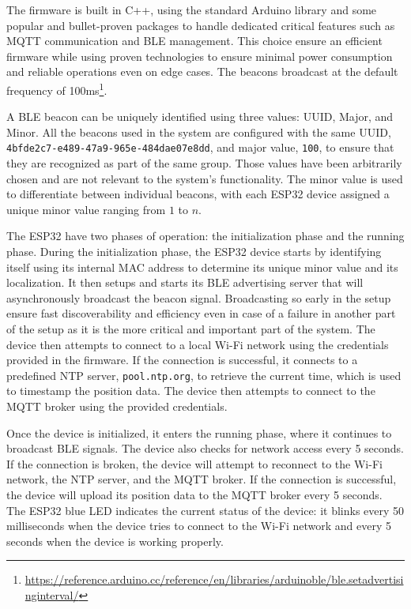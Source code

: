 The firmware is built in C++, using the standard Arduino library and some popular and bullet-proven packages to handle dedicated critical features such as MQTT communication and BLE management. This choice ensure an efficient firmware while using proven technologies to ensure minimal power consumption and reliable operations even on edge cases. The beacons broadcast at the default frequency of 100ms\footnote{\url{https://reference.arduino.cc/reference/en/libraries/arduinoble/ble.setadvertisinginterval/}}.

A BLE beacon can be uniquely identified using three values: UUID, Major, and Minor. All the beacons used in the system are configured with the same UUID, \texttt{4bfde2c7-e489-47a9-965e-484dae07e8dd}, and major value, \texttt{100}, to ensure that they are recognized as part of the same group. Those values have been arbitrarily chosen and are not relevant to the system's functionality. The minor value is used to differentiate between individual beacons, with each ESP32 device assigned a unique minor value ranging from $1$ to $n$.

The ESP32 have two phases of operation: the initialization phase and the running phase. During the initialization phase, the ESP32 device starts by identifying itself using its internal MAC address to determine its unique minor value and its localization. It then setups and starts its BLE advertising server that will asynchronously broadcast the beacon signal. Broadcasting so early in the setup ensure fast discoverability and efficiency even in case of a failure in another part of the setup as it is the more critical and important part of the system. The device then attempts to connect to a local Wi-Fi network using the credentials provided in the firmware. If the connection is successful, it connects to a predefined NTP server, \texttt{pool.ntp.org}, to retrieve the current time, which is used to timestamp the position data. The device then attempts to connect to the MQTT broker using the provided credentials. 

Once the device is initialized, it enters the running phase, where it continues to broadcast BLE signals. The device also checks for network access every 5 seconds. If the connection is broken, the device will attempt to reconnect to the Wi-Fi network, the NTP server, and the MQTT broker. If the connection is successful, the device will upload its position data to the MQTT broker every 5 seconds. The ESP32 blue LED indicates the current status of the device: it blinks every 50 milliseconds when the device tries to connect to the Wi-Fi network and every 5 seconds when the device is working properly.

